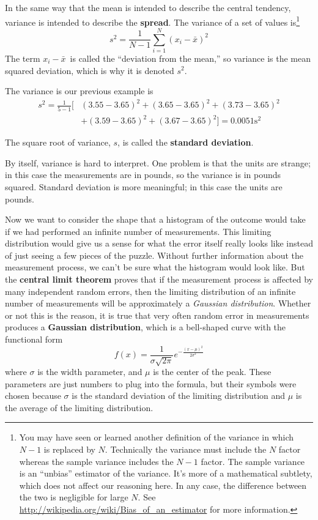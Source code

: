 In the same way that the mean is intended to describe the central
tendency, variance is intended to describe the \textbf{spread}.
The variance of a set of values is\footnote{You may have seen or learned another definition of the variance in which $N-1$ is replaced by $N$. Technically the variance must include the $N$ factor whereas the sample variance includes the $N-1$ factor. The sample variance is an ``unbias'' estimator of the variance. It's more of a mathematical subtlety, which does not affect our reasoning here. In any case, the difference between the two is negligible for large $N$. See
\url{http://wikipedia.org/wiki/Bias_of_an_estimator} for more information.
 }
%
\[ s^2 = \frac{1}{N-1} \sum_{i=1}^N \left(x_i - \bar{x}\right)^2 \]
%
The term $x_i-\bar{x}$~is called the ``deviation from the mean,'' so
variance is the mean squared deviation, which is why it is denoted $s^2$.  


 
The variance is our previous example is
\begin{align*}
 s^2 =\frac{1}{5-1} [&(3.55-3.65)^2+ (3.65-3.65)^2+ (3.73-3.65)^2\\
 &+(3.59-3.65)^2+(3.67-3.65)^2 ] = 0.0051  \text{s}^2
\end{align*}




The square root of variance, $s$, is called the \textbf{ standard deviation}.


By itself, variance is hard to interpret.  One problem is that the
units are strange; in this case the measurements are in pounds, so the
variance is in pounds squared.  Standard deviation is more meaningful;
in this case the units are pounds.



Now we want to consider the shape that a histogram of the outcome would take if we had performed an infinite number of measurements. This limiting distribution would give us a sense for what the error itself really looks like instead of just seeing a few pieces of the puzzle. Without further information about the measurement process, we can't be sure what the histogram would look like. But the \textbf{central limit theorem} proves that if the measurement process is affected by many independent random errors, then the limiting distribution of an infinite number of measurements will be approximately a \textit{Gaussian distribution}. Whether or not this is the reason, it is true that very often random error in measurements produces a \textbf{Gaussian distribution}, which is a bell-shaped curve with the functional form
\begin{equation} f(x) = \frac{1}{\sigma \sqrt{2 \pi}}  e^{-\frac{(x-\mu)^2}{2\sigma^2}}\end{equation}
where $\sigma$ is the width parameter, and $\mu$ is the center of the peak. These parameters are just numbers to plug into the formula, but their symbols were chosen because $\sigma$ is the standard deviation of the limiting distribution and $\mu$ is the average of the limiting distribution.

